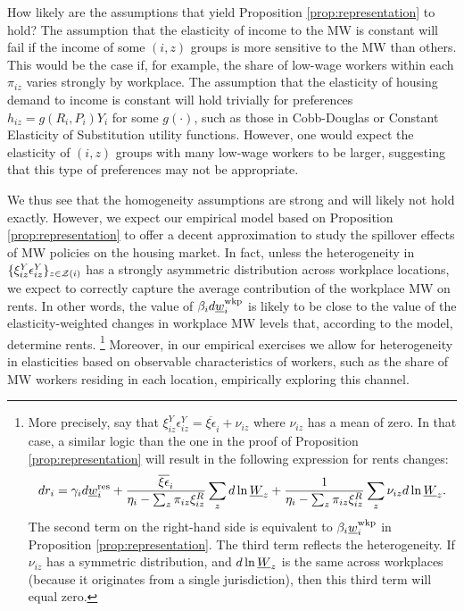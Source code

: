 How likely are the assumptions that yield Proposition \ref{prop:representation}
to hold?
The assumption that the elasticity of income to the MW is constant will fail if 
the income of some $(i,z)$ groups is more sensitive to the MW than others.
This would be the case if, for example, the share of low-wage workers within 
each $\pi_{iz}$ varies strongly by workplace.
The assumption that the elasticity of housing demand to income is constant 
will hold trivially for preferences
$h_{iz} = g\left(R_i, P_i\right) Y_i$ for some $g\left(\cdot\right)$, such as 
those in Cobb-Douglas or Constant Elasticity of Substitution utility functions.
However, one would expect the elasticity of $(i,z)$ groups with many low-wage 
workers to be larger, suggesting that this type of preferences may not be 
appropriate.

We thus see that the homogeneity assumptions are strong and will likely not hold 
exactly.
However, we expect our empirical model based on Proposition 
\ref{prop:representation} to offer a decent approximation to study the spillover
effects of MW policies on the housing market.
In fact, unless the heterogeneity in $\{\xi_{iz}^Y\epsilon_{iz}^Y\}_{z\in\mathcal{Z}(i)}$ 
has a strongly asymmetric distribution across workplace locations, we expect to 
correctly capture the average contribution of the workplace MW on rents.
In other words, the value of $\beta_i  d \underline{w}^{\text{wkp}}_i$ is likely to be close 
to the value of the elasticity-weighted changes in workplace MW levels that, 
according to the model, determine rents.%
\footnote{More precisely, say that 
    $\xi^Y_{iz}\epsilon_{iz}^Y = \overline{\xi\epsilon}_i + \nu_{iz}$ where 
    $\nu_{iz}$ has a mean of zero.
    In that case, a similar logic than the one in the proof of Proposition 
    \ref{prop:representation} will result in the following expression for 
    rents changes:
    $$
        d r_i = \gamma_i d \underline{w}^{\text{res}}_i
            + \frac{\overline{\xi\epsilon}_i}
                    {\eta_{i} - \sum_z \pi_{iz} \xi_{iz}^R} \sum_z d\ln \underline{W}_z
            + \frac{1}
                    {\eta_{i} - \sum_z \pi_{iz} \xi_{iz}^R} \sum_z \nu_{iz} d\ln \underline{W}_z .
    $$
    The second term on the right-hand side is equivalent to $\beta_i \underline{w}_{i}^{\text{wkp}}$
    in Proposition \ref{prop:representation}.
    The third term reflects the heterogeneity.
    If $\nu_{iz}$ has a symmetric distribution, and $d\ln \underline{W}_z$ is the same across 
    workplaces (because it originates from a single jurisdiction), then this third 
    term will equal zero.}
Moreover, in our empirical exercises we allow for heterogeneity in elasticities
based on observable characteristics of workers, 
such as the share of MW workers residing in each location, empirically 
exploring this channel.

